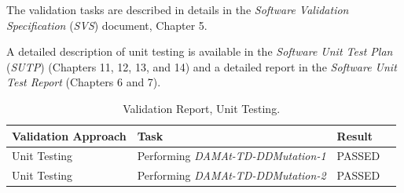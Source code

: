 The validation tasks are described in details in the \emph{Software Validation Specification} (\emph{SVS}) document, Chapter 5.

A detailed description of \DAMA unit testing is available in the \emph{Software Unit Test Plan} (\emph{SUTP}) (Chapters 11, 12, 13, and 14) and a detailed report in the \emph{Software Unit Test Report} (Chapters 6 and 7).

\begin{table}[h]
\caption{\DAMA Validation Report, Unit Testing.}
\label{table:damat:unit_results}
\scriptsize
\centering
\begin{tabular}{|l|l|l|l|}
\hline
\textbf{Validation Approach}&\textbf{Task}&\textbf{Result}\\
\hline
Unit Testing&Performing \emph{DAMAt-TD-DDMutation-1}&PASSED\\
Unit Testing&Performing \emph{DAMAt-TD-DDMutation-2}&PASSED\\
\hline
\end{tabular}

\end{table}


